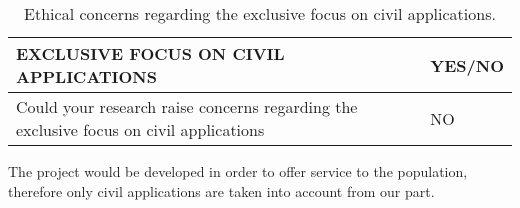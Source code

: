 \begin{table}[H]
	\centering
	\begin{tabular}[H]{>{\arraybackslash}p{10cm}
			>{\arraybackslash}p{3cm} }
		\toprule[2pt]
		
		\textbf{EXCLUSIVE FOCUS ON CIVIL APPLICATIONS} & \textbf{YES/NO} \\
		\midrule[1.5pt]
		Could your research raise concerns regarding the exclusive focus on civil applications & NO\\
		\bottomrule[2pt]		
	\end{tabular}
	\caption[Ethics -Exclusive use on civil applications]{Ethical concerns regarding the exclusive focus on civil applications.}
	\label{Ethics_Civilfocus}
\end{table}

The project would be developed in order to offer service to the population, therefore only civil applications are taken into account from our part.
